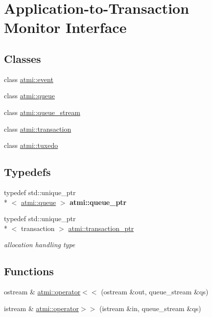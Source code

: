 \hypertarget{group__atmi}{\section{Application-\/to-\/\+Transaction Monitor Interface}
\label{group__atmi}
}
\subsection*{Classes}
\begin{DoxyCompactItemize}
\item 
class \hyperlink{classatmi_1_1event}{atmi\+::event}
\item 
class \hyperlink{classatmi_1_1queue}{atmi\+::queue}
\item 
class \hyperlink{classatmi_1_1queue__stream}{atmi\+::queue\+\_\+stream}
\item 
class \hyperlink{classatmi_1_1transaction}{atmi\+::transaction}
\item 
class \hyperlink{classatmi_1_1tuxedo}{atmi\+::tuxedo}
\end{DoxyCompactItemize}
\subsection*{Typedefs}
\begin{DoxyCompactItemize}
\item 
\hypertarget{group__atmi_ga7cfd5961e0e05b148f12be311177a1a8}{typedef std\+::unique\+\_\+ptr\\*
$<$ \hyperlink{classatmi_1_1queue}{atmi\+::queue} $>$ {\bfseries atmi\+::queue\+\_\+ptr}}\label{group__atmi_ga7cfd5961e0e05b148f12be311177a1a8}

\item 
\hypertarget{group__atmi_gab8e359f2305eaf285b0b0745d3b41997}{typedef std\+::unique\+\_\+ptr\\*
$<$ transaction $>$ \hyperlink{group__atmi_gab8e359f2305eaf285b0b0745d3b41997}{atmi\+::transaction\+\_\+ptr}}\label{group__atmi_gab8e359f2305eaf285b0b0745d3b41997}

\begin{DoxyCompactList}\small\item\em allocation handling type \end{DoxyCompactList}\end{DoxyCompactItemize}
\subsection*{Functions}
\begin{DoxyCompactItemize}
\item 
ostream \& \hyperlink{group__atmi_gaf3fe9481b5d6e19d1fb56e27baff2154}{atmi\+::operator$<$$<$} (ostream \&out, queue\+\_\+stream \&qs)
\item 
istream \& \hyperlink{group__atmi_gadb0ca17e8de1eecddb5c95b86441ffdc}{atmi\+::operator$>$$>$} (istream \&in, queue\+\_\+stream \&qs)
\end{DoxyCompactItemize}


